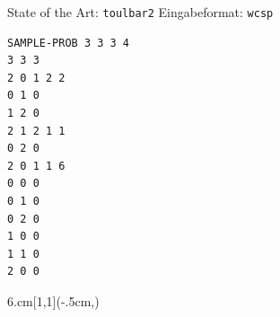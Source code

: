 \begin{frame}[fragile]{State of the Art: \texttt{toulbar2}}
Eingabeformat: \texttt{wcsp}

\vspace*{2ex}

\begin{verbatim}
SAMPLE-PROB 3 3 3 4
3 3 3
2 0 1 2 2
0 1 0 
1 2 0
2 1 2 1 1
0 2 0
2 0 1 1 6
0 0 0
0 1 0
0 2 0 
1 0 0 
1 1 0
2 0 0
\end{verbatim}


\begin{textblock*}{6.cm}[1,1](\textwidth-.5cm,\textheight-1.03cm)
\end{textblock*}

\end{frame}


